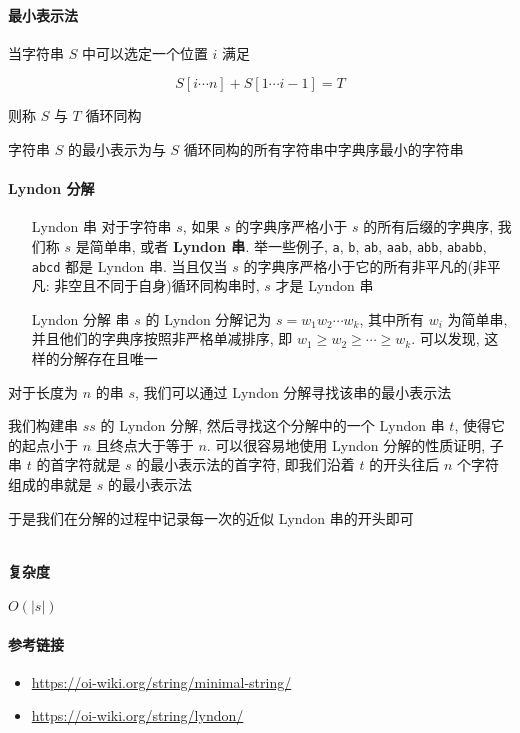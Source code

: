 \paragraph{最小表示法}

当字符串 \(S\) 中可以选定一个位置 \(i\) 满足

\[
    S[i\cdots n]+S[1\cdots i-1]=T
\]

则称 \(S\) 与 \(T\) 循环同构

字符串 \(S\) 的最小表示为与 \(S\) 循环同构的所有字符串中字典序最小的字符串

\paragraph{Lyndon 分解}

\begin{enumerate}
    \item[Lyndon 串] 对于字符串 \(s\), 如果 \(s\) 的字典序严格小于 \(s\) 的所有后缀的字典序, 我们称 \(s\) 是简单串, 或者 \textbf{Lyndon 串}. 举一些例子, \verb|a|, \verb|b|, \verb|ab|, \verb|aab|, \verb|abb|, \verb|ababb|, \verb|abcd| 都是 Lyndon 串. 当且仅当 \(s\) 的字典序严格小于它的所有非平凡的(非平凡: 非空且不同于自身)循环同构串时, \(s\) 才是 Lyndon 串
    \item[Lyndon 分解] 串 \(s\) 的 Lyndon 分解记为 \(s=w_1w_2\cdots w_k\), 其中所有 \(w_i\) 为简单串, 并且他们的字典序按照非严格单减排序, 即 \(w_1\ge w_2\ge\cdots\ge w_k\). 可以发现, 这样的分解存在且唯一
\end{enumerate}

对于长度为 \(n\) 的串 \(s\), 我们可以通过 Lyndon 分解寻找该串的最小表示法

我们构建串 \(ss\) 的 Lyndon 分解, 然后寻找这个分解中的一个 Lyndon 串 \(t\), 使得它的起点小于 \(n\) 且终点大于等于 \(n\). 可以很容易地使用 Lyndon 分解的性质证明, 子串 \(t\) 的首字符就是 \(s\) 的最小表示法的首字符, 即我们沿着 \(t\) 的开头往后 \(n\) 个字符组成的串就是 \(s\) 的最小表示法

于是我们在分解的过程中记录每一次的近似 Lyndon 串的开头即可

\inputminted{cpp}{src/src/min_cyclic_string.txt}

\paragraph{复杂度}

\(O(|s|)\)

\paragraph{参考链接}

\begin{itemize}
    \item \url{https://oi-wiki.org/string/minimal-string/}
    \item \url{https://oi-wiki.org/string/lyndon/}
\end{itemize}
